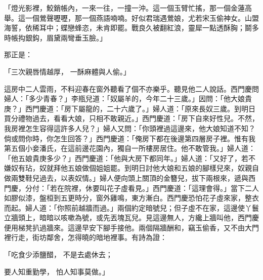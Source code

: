 「燈光影裡，鮫銷帳內，一來一往，一撞一沖。這一個玉臂忙搖，那一個金蓮高舉。這一個鶯聲嚦嚦，那一個燕語喃喃。好似君瑞遇鶯娘，尤若宋玉偷神女。山盟海誓，依稀耳中；蝶戀蜂恣，未肯即罷。戰良久被翻紅浪，靈犀一點透酥胸；鬬多時帳抅銀鈎，眉黛兩彎垂玉臉。」

那正是：

「三次親唇情越厚，  一酥麻體與人偷。」

這房中二人雲雨，不料迎春在窗外聽看了個不亦樂乎。聽見他二人說話。西門慶問婦人：「多少青春？」李瓶兒道：「奴屬羊的，今年二十三歲。」因問：「他大娘貴庚？」西門慶道：「房下屬龍的，二十六歲了。」婦人道：「原來長奴三歲。到明日買分禮物過去，看看大娘，只相不敢親近。」西門慶道：「房下自來好性兒。不然，我房裡怎生容得這許多人兒？」婦人又問：「你頭裡過這邊來，他大娘知道不知？倘或問你時，你怎生回答？」西門慶道：「俺房下都在後邊第四層房子裡。惟有我第五個小妾潘氏，在這前邊花園內，獨自一所樓房居住。他不敢管我。」婦人道：「他五娘貴庚多少？」西門慶道：「他與大房下都同年。」婦人道：「又好了，若不嫌奴有玷，奴就拜他五娘做個姐姐罷。到明日討他大娘和五娘的腳樣兒來，奴親自做兩雙鞋兒過去，以表奴情。」婦人便向頭上關頂的金簪兒，拔下兩根來，遞與西門慶，分付：「若在院裡，休要叫花子虛看見。」西門慶道：「這理會得。」當下二人如膠似漆，盤桓到五更時分，窗外雞鳴，東方漸白。西門慶恐怕花子虛來家，整衣而起。婦人道：「你照前越牆而過。」兩個約定暗號兒；但子虛不在家，這邊使丫鬟立牆頭上，暗暗以咳嗽為號，或先丟塊瓦兒。見這邊無人，方纔上牆叫他，西門慶便用梯凳扒過牆來。這邊早安下腳手接他。兩個隔牆酬和，竊玉偷香，又不由大門裡行走，街坊鄰舍，怎得曉的暗地裡事。有詩為證：

「吃食少添鹽醋，  不是去處休去；

要人知重勤學，  怕人知事莫做。」

